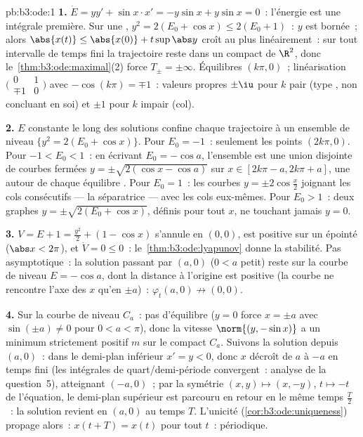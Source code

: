 \begin{solution}{pb:b3:ode:1}
\textbf{1.} $\dot E = yy' + \sin x\cdot x' = -y\sin x +
y\sin x = 0$~: l'énergie est une intégrale première. Sur une
, $y^2 = 2(E_0 + \cos x) \leq 2(E_0 + 1)$~:
$y$ est bornée~; alors $\abs{x(t)} \leq \abs{x(0)} +
t\sup\abs y$ croît au plus linéairement~: sur tout intervalle
de temps fini la trajectoire reste dans un compact de
$\R^2$, donc le~\cref{thm:b3:ode:maximal}(2) force $T_\pm =
\pm\infty$. Équilibres $(k\pi, 0)$~; linéarisation
$\bigl(\begin{smallmatrix}0&1\\
\mp1&0\end{smallmatrix}\bigr)$ avec $-\cos(k\pi) = \mp1$~:
valeurs propres $\pm\iu$ pour $k$ pair (type , non
concluant en soi) et $\pm1$ pour $k$ impair (col).

\textbf{2.} $E$ constante le long des solutions confine
chaque trajectoire à un ensemble de niveau $\{y^2 = 2(E_0 +
\cos x)\}$. Pour $E_0 = -1$~: seulement les points $(2k\pi,
0)$. Pour $-1 < E_0 < 1$~: en écrivant $E_0 = -\cos a$,
l'ensemble est une union disjointe de courbes fermées $y =
\pm\sqrt{2(\cos x - \cos a)}$ sur $x \in [2k\pi - a, 2k\pi +
a]$, une autour de chaque équilibre . Pour $E_0 = 1$~:
les courbes $y = \pm2\cos\frac x2$ joignant les cols
consécutifs --- la séparatrice --- avec les cols
eux-mêmes. Pour $E_0 > 1$~: deux graphes $y =
\pm\sqrt{2(E_0 + \cos x)}$, définis pour tout $x$, ne
touchant jamais $y = 0$.

\textbf{3.} $V = E + 1 = \frac{y^2}2 + (1 - \cos x)$
s'annule en $(0,0)$, est positive sur un  épointé
($\abs x < 2\pi$), et $\dot V = 0 \leq 0$~:
le~\cref{thm:b3:ode:lyapunov} donne la stabilité. Pas
asymptotique~: la solution passant par $(a, 0)$ ($0 < a$
petit) reste sur la courbe de niveau $E = -\cos a$, dont la
distance à l'origine est positive (la courbe ne rencontre
l'axe des $x$ qu'en $\pm a$)~: $\varphi_t(a, 0) \not\to
(0,0)$.

\textbf{4.} Sur la courbe de niveau $C_a$~: pas d'équilibre
($y = 0$ force $x = \pm a$ avec $\sin(\pm a) \neq 0$ pour $0
< a < \pi$), donc la vitesse $\norm{(y, -\sin x)}$ a un
minimum strictement positif $m$ sur le compact $C_a$.
Suivons la solution depuis $(a, 0)$~: dans le demi-plan
inférieur $x' = y < 0$, donc $x$ décroît de $a$ à $-a$ en
temps fini (les intégrales de quart/demi-période
convergent~: analyse de la question~5), atteignant $(-a,
0)$~; par la symétrie $(x, y) \mapsto (x, -y)$, $t \mapsto
-t$ de l'équation, le demi-plan supérieur est parcouru en
retour en le même temps $\frac T2$~: la solution revient en
$(a, 0)$ au temps $T$. L'unicité
(\cref{cor:b3:ode:uniqueness}) propage alors~: $x(t + T) =
x(t)$ pour tout $t$~: périodique.


\end{solution}
